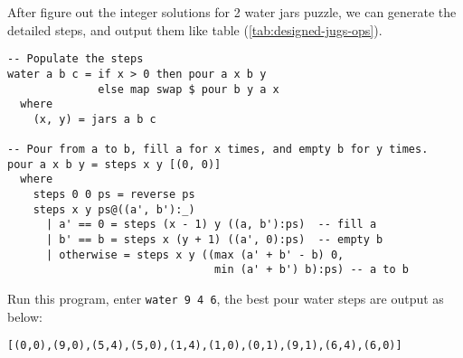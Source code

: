 \documentclass{article}
\begin{document}
After figure out the integer solutions for 2 water jars puzzle, we can generate the detailed steps, and output them like table (\ref{tab:designed-jugs-ops}).

\lstset{frame=single}
\begin{lstlisting}
-- Populate the steps
water a b c = if x > 0 then pour a x b y
              else map swap $ pour b y a x
  where
    (x, y) = jars a b c

-- Pour from a to b, fill a for x times, and empty b for y times.
pour a x b y = steps x y [(0, 0)]
  where
    steps 0 0 ps = reverse ps
    steps x y ps@((a', b'):_)
      | a' == 0 = steps (x - 1) y ((a, b'):ps)  -- fill a
      | b' == b = steps x (y + 1) ((a', 0):ps)  -- empty b
      | otherwise = steps x y ((max (a' + b' - b) 0,
                                min (a' + b') b):ps) -- a to b
\end{lstlisting}

Run this program, enter \texttt{water 9 4 6}, the best pour water steps
are output as below:

\begin{verbatim}
[(0,0),(9,0),(5,4),(5,0),(1,4),(1,0),(0,1),(9,1),(6,4),(6,0)]
\end{verbatim}
\end{document}
